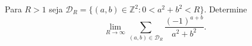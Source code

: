 Para \(R>1\) seja \(\mathcal{D}_R =\{ (a,b)\in \mathbb{Z}^2: 0<a^2+b^2<R\}\). Determine
\[\lim_{R\rightarrow \infty}{\sum_{(a,b)\in \mathcal{D}_R}{\frac{(-1)^{a+b}}{a^2+b^2}}}.\]
